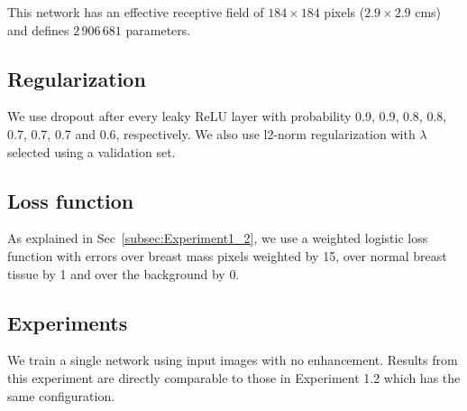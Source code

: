 This network has an effective receptive field of $184 \times 184$ pixels ($2.9 \times 2.9$ cms) and defines $2\,906\,681$ parameters. %

\subsection{Regularization}
We use dropout after every leaky ReLU layer with probability 0.9, 0.9, 0.8, 0.8, 0.7, 0.7, 0.7 and 0.6, respectively. We also use l2-norm regularization with $\lambda$ selected using a validation set.

\subsection{Loss function}
As explained in Sec~\ref{subsec:Experiment1_2}, we use a weighted logistic loss function with errors over breast mass pixels weighted by 15, over normal breast tissue by 1 and over the background by 0.

\subsection{Experiments}
We train a single network using input images with no enhancement. Results from this experiment are directly comparable to those in Experiment 1.2 which has the same configuration.
